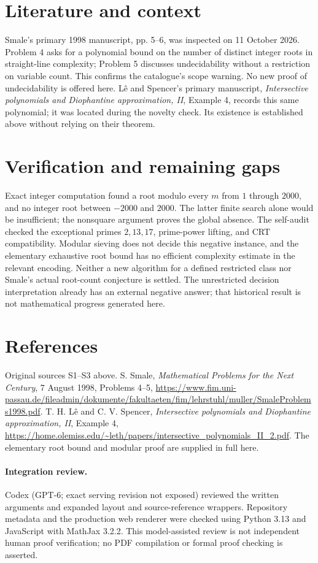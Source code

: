 \documentclass[11pt]{article}
\begin{document}
\section{Literature and context}
Smale's primary 1998 manuscript, pp. 5--6, was inspected on 11 October 2026. Problem 4 asks for a polynomial bound on the number of distinct integer roots in straight-line complexity; Problem 5 discusses undecidability without a restriction on variable count. This confirms the catalogue's scope warning. No new proof of undecidability is offered here. L\^e and Spencer's primary manuscript, \emph{Intersective polynomials and Diophantine approximation, II}, Example 4, records this same polynomial; it was located during the novelty check. Its existence is established above without relying on their theorem.

\section{Verification and remaining gaps}
Exact integer computation found a root modulo every $m$ from $1$ through $2000$, and no integer root between $-2000$ and $2000$. The latter finite search alone would be insufficient; the nonsquare argument proves the global absence. The self-audit checked the exceptional primes $2,13,17$, prime-power lifting, and CRT compatibility. Modular sieving does not decide this negative instance, and the elementary exhaustive root bound has no efficient complexity estimate in the relevant encoding. Neither a new algorithm for a defined restricted class nor Smale's actual root-count conjecture is settled. The unrestricted decision interpretation already has an external negative answer; that historical result is not mathematical progress generated here.

\section{References}
Original sources S1--S3 above. S. Smale, \emph{Mathematical Problems for the Next Century}, 7 August 1998, Problems 4--5, \url{https://www.fim.uni-passau.de/fileadmin/dokumente/fakultaeten/fim/lehrstuhl/muller/SmaleProblems1998.pdf}. T. H. L\^e and C. V. Spencer, \emph{Intersective polynomials and Diophantine approximation, II}, Example 4, \url{https://home.olemiss.edu/~leth/papers/intersective_polynomials_II_2.pdf}. The elementary root bound and modular proof are supplied in full here.


\paragraph{Integration review.} Codex (GPT-6; exact serving revision not exposed) reviewed the written arguments and expanded layout and source-reference wrappers. Repository metadata and the production web renderer were checked using Python 3.13 and JavaScript with MathJax 3.2.2. This model-assisted review is not independent human proof verification; no PDF compilation or formal proof checking is asserted.
\end{document}
